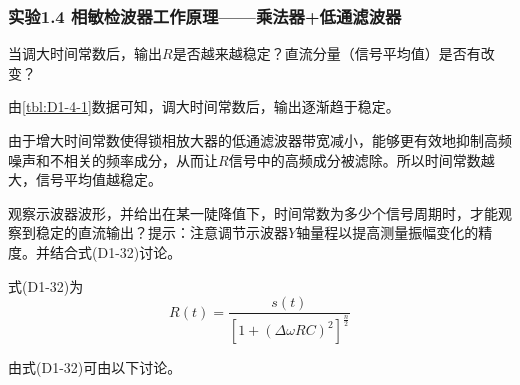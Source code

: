 \documentclass[dvipsnames, svgnames,a4paper,11pt]{article}
\begin{document}
		
	\subsubsection*{实验1.4 \quad 相敏检波器工作原理——乘法器+低通滤波器}

		\begin{tcolorbox}[colback=yellow!20, colframe=black!75, title=【问题 6】]
			当调大时间常数后，输出$R$是否越来越稳定？直流分量（信号平均值）是否有改变？
		\end{tcolorbox}

		由\cref{tbl:D1-4-1}数据可知，调大时间常数后，输出逐渐趋于稳定。
		
		由于增大时间常数使得锁相放大器的低通滤波器带宽减小，能够更有效地抑制高频噪声和不相关的频率成分，从而让$R$信号中的高频成分被滤除。所以时间常数越大，信号平均值越稳定。


		\vspace{0.05\textwidth} %

		\begin{tcolorbox}[colback=yellow!20, colframe=black!75, title=【问题 7】]
			观察示波器波形，并给出在某一陡降值下，时间常数为多少个信号周期时，才能观察到稳定的直流输出？提示：注意调节示波器$Y$轴量程以提高测量振幅变化的精度。并结合式(D1-32)讨论。
		\end{tcolorbox}

		式(D1-32)为
		\[
			R(t) = \frac{s(t)}{[1 + (\Delta\omega R C)^2]^{\frac{n}{2}}}
		\]

		由式(D1-32)可由以下讨论。
\end{document}
